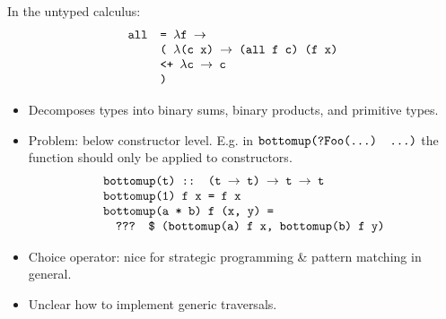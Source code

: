 \documentclass[leqno, fleqn]{foils}
\newcommand{\ve}[1]{\ensuremath{\text{\tt #1}}}
\newcommand{\ra}{\ensuremath{\rightarrow} }
\begin{document}

In the untyped calculus:
\[
\begin{array}{ll}
\ve{all} & \ve{= $\lambda$f \ra} \\
         & \ve{( $\lambda$(c x) \ra (all f c) (f x)} \\
         & \ve{<+ $\lambda$c \ra c} \\
         & \ve{)}
\end{array}
\]


\begin{itemize}
\item Decomposes types into binary sums, binary products, and
  primitive types.
\item Problem: below constructor level.  E.g. in
  \ve{bottomup(?Foo(...) ...)} the function should only be applied to
  constructors.
\[
\begin{array}{ll}
\ve{bottomup(t) :: (t \ra t) \ra t \ra t} \\
\ve{bottomup(1) f x = f x} \\
\ve{bottomup(a * b) f (x, y) =} \\
\quad \ve{??? \$ (bottomup(a) f x, bottomup(b) f y)}
\end{array}
\]
\end{itemize}



\begin{itemize}
\item Choice operator: nice for strategic programming \& pattern
  matching in general.
\item Unclear how to implement generic traversals.
\end{itemize}
\end{document}
